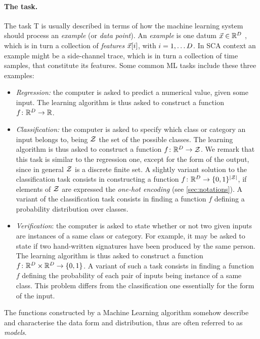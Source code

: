 \paragraph*{The task.} The task T is usually described in terms of how the machine learning system should process an \emph{example} (or \emph{data point}). An \emph{example} is one datum $\vec{x}\in \mathbb{R}^D$ , which is in turn a collection of \emph{features} $\vec{x}[i]$, with  $i=1,\dots D$. In SCA context an example might be a side-channel trace, which is in turn a collection of time samples, that constitute its features. Some common ML tasks include these three examples: 
\begin{itemize}
\item \emph{Regression: } the computer is asked to predict a numerical value, given some input. The learning algorithm is thus asked to construct a function $f\colon \mathbb{R}^D \rightarrow \mathbb{R}$.
\item \emph{Classification: } the computer is asked to specify which class or category an input belongs to, being $\mathcal{Z}$ the set of the possible classes. The learning algorithm is thus asked to construct a function $f\colon \mathbb{R}^D \rightarrow \mathcal{Z}$. We remark that this task is similar to the regression one, except for the form of the output, since in general $\mathcal{Z}$ is a discrete finite set. A slightly variant solution to the classification task consists in constructing a function $f\colon \mathbb{R}^D \rightarrow \{0,1\}^{\lvert\mathcal{Z}\rvert}$, if elements of $\mathcal{Z}$ are expressed \via the \emph{one-hot encoding} (see \ref{sec:notations}). A variant of the classification task consists in finding a function $f$ defining a probability distribution over classes.
\item \emph{Verification}: the computer is asked to state whether or not two given inputs are instances of a same class or category. For example, it may be asked to state if two hand-written signatures have been produced by the same person. The learning algorithm is thus asked to construct a function $f\colon \mathbb{R}^D \times \mathbb{R}^{D}\rightarrow \{0,1\}$. A variant of such a task consists in finding a function $f$ defining the probability of each pair of inputs being instance of a same class. This problem differs from the classification one essentially for the form of the input.
\end{itemize}
The functions constructed by a Machine Learning algorithm somehow describe and characterise the data form and distribution, thus are often referred to as \emph{models}.

